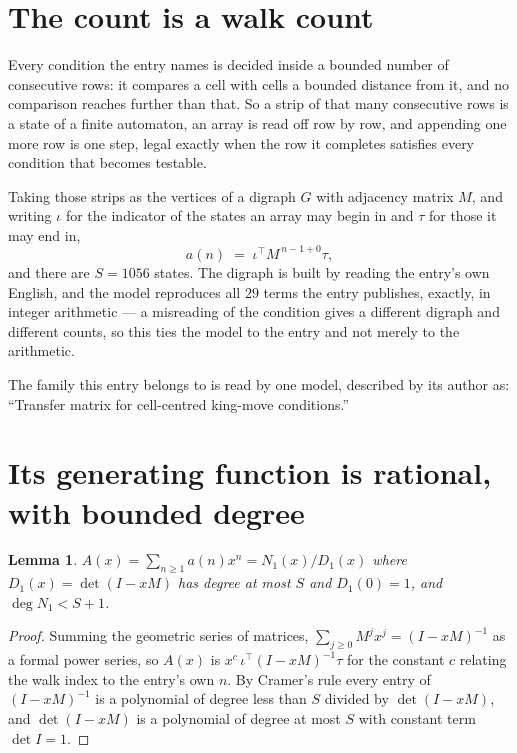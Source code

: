 \documentclass[11pt,a4paper]{article}
\theoremstyle{plain}
\newtheorem{lemma}[theorem]{Lemma}
\theoremstyle{definition}
\begin{document}
\section{The count is a walk count}

Every condition the entry names is decided inside a bounded number of consecutive rows: it
compares a cell with cells a bounded distance from it, and no comparison reaches further than
that. So a strip of that many consecutive rows is a state of a finite automaton, an array is
read off row by row, and appending one more row is one step, legal exactly when the row it
completes satisfies every condition that becomes testable.

Taking those strips as the vertices of a digraph $G$ with adjacency matrix $M$, and writing
$\iota$ for the indicator of the states an array may begin in and $\tau$ for those it may end
in,
\[
a(n)\;=\;\iota^{\!\top}M^{\,n-1+0}\tau ,
\]
and there are $S=1056$ states. The digraph is built by reading the entry's own English, and the
model reproduces all $29$ terms the entry publishes, exactly, in integer arithmetic --- a
misreading of the condition gives a different digraph and different counts, so this ties the
model to the entry and not merely to the arithmetic.

The family this entry belongs to is read by one model, described by its author as: ``Transfer matrix for cell-centred king-move conditions.''


\section{Its generating function is rational, with bounded degree}

\begin{lemma}\label{lem:rat}
$A(x)=\sum_{n\ge1}a(n)x^n=N_1(x)/D_1(x)$ where $D_1(x)=\det(I-xM)$ has degree at most
$S$ and $D_1(0)=1$, and $\deg N_1<S+1$.
\end{lemma}

\begin{proof}
Summing the geometric series of matrices, $\sum_{j\ge0}M^jx^j=(I-xM)^{-1}$ as a formal
power series, so $A(x)$ is $x^{c}\,\iota^{\!\top}(I-xM)^{-1}\tau$ for the constant $c$
relating the walk index to the entry's own $n$. By Cramer's rule every entry of
$(I-xM)^{-1}$ is a polynomial of degree less than $S$ divided by $\det(I-xM)$, and
$\det(I-xM)$ is a polynomial of degree at most $S$ with constant term $\det I=1$.
\end{proof}
\end{document}
